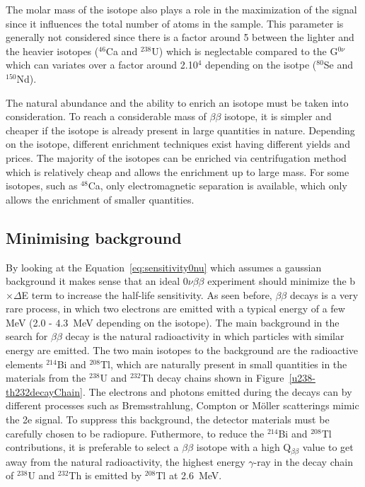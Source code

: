 \documentclass[main.tex]{subfiles}
\begin{document}
\bigskip


\NI The molar mass of the isotope also plays a role in the maximization of the signal since it influences the total number of atoms in the sample. This parameter is generally not considered since there is a factor around 5 between the lighter and the heavier  isotopes ($^{\text{46}}$Ca and $^{\text{238}}$U) which is neglectable compared to the G$^{\text{0}\nu}$ which can variates over a factor around 2.10$^{\text{4}}$ depending on the isotpe ($^{\text{80}}$Se and $^{\text{150}}$Nd). 


\bigskip


\NI The natural abundance and the ability to enrich an isotope must be taken into consideration. To reach a considerable mass of $\beta\beta$ isotope, it is simpler and cheaper if the isotope is already present in large quantities in nature. Depending on the isotope, different enrichment techniques exist having different yields and prices. The majority of the isotopes can be enriched via centrifugation method which is relatively cheap and allows the enrichment up to large mass. For some isotopes, such as $^{\text{48}}$Ca, only electromagnetic separation is available, which only allows the enrichment of smaller quantities.


\subsection{Minimising background}\label{sec:MinimisingBkg}


\NI By looking at the Equation~\ref{eq:sensitivity0nu} which assumes a gaussian background it makes sense that an ideal 0$\nu\beta\beta$ experiment should minimize the b$\times\Delta$E term to increase the half-life sensitivity. As seen before, $\beta\beta$ decays is a very rare process, in which two electrons are emitted with a typical energy of a few MeV (2.0 - 4.3~MeV depending on the isotope). The main background in the search for $\beta\beta$ decay is the natural radioactivity in which particles with similar energy are emitted. The two main isotopes to the background are the radioactive elements $^{\text{214}}$Bi and $^{\text{208}}$Tl, which are naturally present in small quantities in the materials from the $^{\text{238}}$U and $^{\text{232}}$Th decay chains shown in Figure~\ref{u238-th232decayChain}. The electrons and photons emitted during the decays can by different processes such as Bremsstrahlung, Compton or Möller scatterings mimic the 2e signal. To suppress this background, the detector materials must be carefully chosen to be radiopure. Futhermore, to reduce the $^{\text{214}}$Bi and $^{\text{208}}$Tl contributions, it is preferable to select a $\beta\beta$ isotope with a high Q$_{\beta\beta}$ value to get away from the natural radioactivity, the highest energy $\gamma$-ray in the decay chain of $^{\text{238}}$U and $^{\text{232}}$Th is emitted by $^{\text{208}}$Tl at 2.6~MeV.
\end{document}
